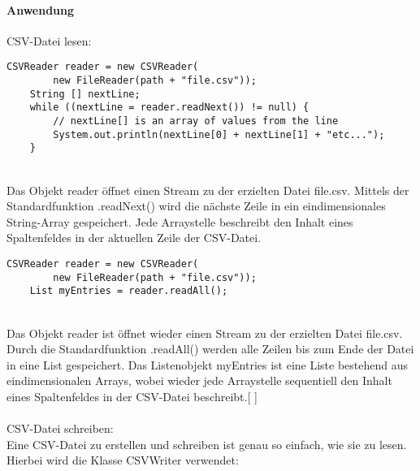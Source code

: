 \documentclass[FIPLY_base.tex]{subfiles}
\begin{document}
\paragraph{Anwendung}
CSV-Datei lesen:
\begin{lstlisting}[caption={Verwendung von CSVReader: Möglichkeit 1, iterativ},label=DescriptiveLabel]
	CSVReader reader = new CSVReader(
		new FileReader(path + "file.csv"));
	String [] nextLine;
	while ((nextLine = reader.readNext()) != null) {
		// nextLine[] is an array of values from the line
		System.out.println(nextLine[0] + nextLine[1] + "etc...");
	}

\end{lstlisting}
\ \\
Das Objekt \grqq{}reader\grqq{} öffnet einen Stream zu der erzielten Datei \grqq{}file.csv\grqq{}. Mittels der Standardfunktion .readNext() wird die nächste Zeile in ein eindimensionales String-Array gespeichert. Jede Arraystelle beschreibt den Inhalt eines Spaltenfeldes in der aktuellen Zeile der CSV-Datei.
\ \\
\begin{lstlisting}[caption={Verwendung von CSVReader: Möglichkeit 2, alles auf einmal},label=DescriptiveLabel]
	CSVReader reader = new CSVReader(
		new FileReader(path + "file.csv"));
	List myEntries = reader.readAll();
\end{lstlisting}
\ \\
Das Objekt reader ist öffnet wieder einen Stream zu der erzielten Datei \grqq{}file.csv\grqq{}. Durch die Standardfunktion .readAll() werden alle Zeilen bis zum Ende der Datei in eine List gespeichert. Das Listenobjekt myEntries ist eine Liste bestehend aus eindimensionalen Arrays, wobei wieder jede Arraystelle sequentiell den Inhalt eines Spaltenfeldes in der CSV-Datei beschreibt.[ \cite{exportCSVSourceRead}] 
\ \\
\ \\
CSV-Datei schreiben:
\ \\
Eine CSV-Datei zu erstellen und schreiben ist genau so einfach, wie sie zu lesen. Hierbei wird die Klasse \grqq{}CSVWriter\grqq{} verwendet:
\end{document}
